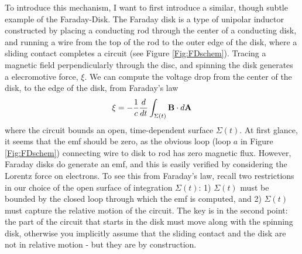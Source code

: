 To introduce this mechanism, I want to first introduce a
similar, though subtle example of the Faraday-Disk. The Faraday disk is a type
of unipolar inductor constructed by placing a conducting rod through the
center of a conducting disk, and running a wire from the top of the rod to the
outer edge of the disk, where a sliding contact completes a circuit (see
Figure \ref{Fig:FDschem}). Tracing a magnetic field perpendicularly through the disc, and
spinning the disk generates a elecromotive force, $\xi$. We can compute the
voltage drop from the center of the disk, to the edge of the disk, from
Faraday's law 
\begin{align} 
\xi = - \frac{1}{c}\frac{d}{dt}\int_{\Sigma(t)}{{\bf B} \cdot d{\bf A}} 
\end{align} 
where the circuit bounds an open, time-dependent surface $\Sigma(t)$. At first
glance, it seems that the emf should be zero, as the obvious loop (loop $a$ in
Figure \ref{Fig:FDschem}) connecting wire to disk to rod has zero magnetic
flux. However, Faraday disks do generate an emf, and this is easily verified
by considering the Lorentz force on electrons. To see this from Faraday's law, recall two restrictions in our
choice of the open surface of integration $\Sigma(t)$: 1) $\Sigma(t)$ must be bounded by the closed loop through which the emf is computed, and 2) $\Sigma(t)$ must capture the relative motion of the circuit.
The key is in the second point: the part of the circuit that starts in the
disk must move along with the spinning disk, otherwise you implicitly assume
that the sliding contact and the disk are not in relative motion - but they
are by construction.


